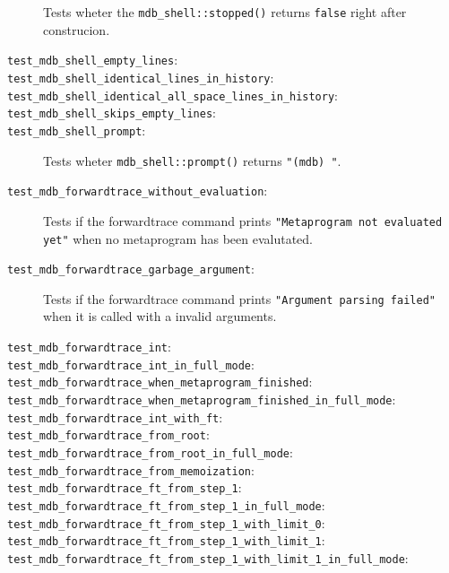 \begin{description}
        Tests wheter the \texttt{mdb\_shell::stopped()} returns \texttt{false}
        right after construcion.
    \item[\texttt{test\_mdb\_shell\_empty\_lines}:]
    \item[\texttt{test\_mdb\_shell\_identical\_lines\_in\_history}:]
    \item[\texttt{test\_mdb\_shell\_identical\_all\_space\_lines\_in\_history}:]
    \item[\texttt{test\_mdb\_shell\_skips\_empty\_lines}:]
    \item[\texttt{test\_mdb\_shell\_prompt}:]
        Tests wheter \texttt{mdb\_shell::prompt()} returns \texttt{"(mdb) "}.
    \item[\texttt{test\_mdb\_forwardtrace\_without\_evaluation}:]
        Tests if the forwardtrace command prints
        \texttt{"Metaprogram not evaluated yet"} when no metaprogram has been
        evalutated.
    \item[\texttt{test\_mdb\_forwardtrace\_garbage\_argument}:]
        Tests if the forwardtrace command prints
        \texttt{"Argument parsing failed"} when it is called with a invalid
        arguments.
    \item[\texttt{test\_mdb\_forwardtrace\_int}:]
    \item[\texttt{test\_mdb\_forwardtrace\_int\_in\_full\_mode}:]
    \item[\texttt{test\_mdb\_forwardtrace\_when\_metaprogram\_finished}:]
    \item[\texttt{test\_mdb\_forwardtrace\_when\_metaprogram\_finished\_in\_full\_mode}:]
    \item[\texttt{test\_mdb\_forwardtrace\_int\_with\_ft}:]
    \item[\texttt{test\_mdb\_forwardtrace\_from\_root}:]
    \item[\texttt{test\_mdb\_forwardtrace\_from\_root\_in\_full\_mode}:]
    \item[\texttt{test\_mdb\_forwardtrace\_from\_memoization}:]
    \item[\texttt{test\_mdb\_forwardtrace\_ft\_from\_step\_1}:]
    \item[\texttt{test\_mdb\_forwardtrace\_ft\_from\_step\_1\_in\_full\_mode}:]
    \item[\texttt{test\_mdb\_forwardtrace\_ft\_from\_step\_1\_with\_limit\_0}:]
    \item[\texttt{test\_mdb\_forwardtrace\_ft\_from\_step\_1\_with\_limit\_1}:]
    \item[\texttt{test\_mdb\_forwardtrace\_ft\_from\_step\_1\_with\_limit\_1\_in\_full\_mode}:]

\end{description}
